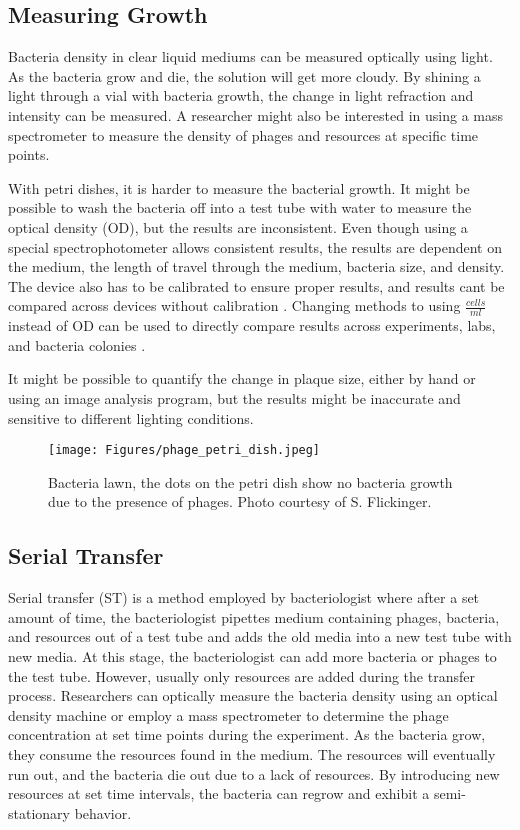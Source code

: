 \subsection{Measuring Growth}
Bacteria density in clear liquid mediums can be measured optically using light. 
As the bacteria grow and die, the solution will get more cloudy. 
By shining a light through a vial with bacteria growth, the change in light refraction and intensity can be measured. 
A researcher might also be interested in using a mass spectrometer to measure the density of phages and resources at specific time points. 

With petri dishes, it is harder to measure the bacterial growth. 
It might be possible to wash the bacteria off into a test tube with water to measure the optical density (OD), but the results are inconsistent. 
Even though using a special spectrophotometer allows consistent results, the results are dependent on the medium, the length of travel through the medium, bacteria size, and density. 
The device also has to be calibrated to ensure proper results, and results cant be compared across devices without calibration \cite{bealRobustEstimationBacterial2020}. 
Changing methods to using $\frac{\textit{cells}}{\textit{ml}}$ instead of OD can be used to directly compare results across experiments, labs, and bacteria colonies \cite{miraEstimatingMicrobialPopulation2022}. 

It might be possible to quantify the change in plaque size, either by hand or using an image analysis program, but the results might be inaccurate and sensitive to different lighting conditions. 

\begin{figure}[h!]
    \texttt{[image: Figures/phage\_petri\_dish.jpeg]}
    \centering
    \caption{
        Bacteria lawn, the dots on the petri dish show no bacteria growth due to the presence of phages. 
        Photo courtesy of S. Flickinger. 
    }
    \label{fig:phage_petri_dish}
\end{figure}
\subsection{Serial Transfer}
Serial transfer (ST) is a method employed by bacteriologist where after a set amount of time, the bacteriologist pipettes medium containing phages, bacteria, and resources out of a test tube and adds the old media into a new test tube with new media.
At this stage, the bacteriologist can add more bacteria or phages to the test tube. 
However, usually only resources are added during the transfer process.
Researchers can optically measure the bacteria density using an optical density machine or employ a mass spectrometer to determine the phage concentration at set time points during the experiment. 
As the bacteria grow, they consume the resources found in the medium.
The resources will eventually run out, and the bacteria die out due to a lack of resources.
By introducing new resources at set time intervals, the bacteria can regrow and exhibit a semi-stationary behavior.

